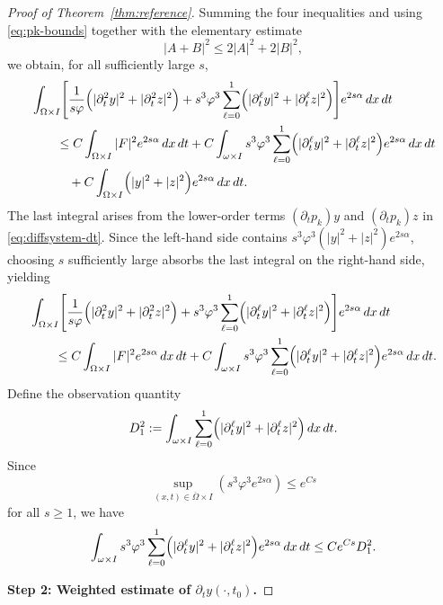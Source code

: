 \documentclass[10pt,a4paper]{amsart}
\newcommand{\Om}{\Omega}
\newcommand{\p}{\partial}
\begin{document}
\begin{proof}[Proof of Theorem~\ref{thm:reference}]
Summing the four inequalities and using \eqref{eq:pk-bounds} together with
the elementary estimate $$|A+B|^2\le2|A|^2+2|B|^2,$$ we obtain, for all
sufficiently large $s$,
\begin{align}
&\int_{\Omega\times I}\Biggl[
\frac{1}{s\varphi}\Bigl(|\p_t^2 y|^2+|\p_t^2 z|^2\Bigr)
+s^3\varphi^3\sum_{\ell=0}^1
\Bigl(|\p_t^\ell y|^2+|\p_t^\ell z|^2\Bigr)
\Biggr]e^{2s\alpha}\,dx\,dt \notag\\
&\qquad\le
C\int_{\Omega\times I}|F|^2 e^{2s\alpha}\,dx\,dt
+C\int_{\omega\times I}s^3\varphi^3\sum_{\ell=0}^1
\Bigl(|\p_t^\ell y|^2+|\p_t^\ell z|^2\Bigr)e^{2s\alpha}\,dx\,dt
\notag\\
&\qquad\quad
+C\int_{\Omega\times I}
\Bigl(|y|^2+|z|^2\Bigr)e^{2s\alpha}\,dx\,dt.
\label{eq:carleman-preabsorb}
\end{align}
The last integral arises from the lower-order terms
$(\p_t p_k)y$ and $(\p_t p_k)z$ in \eqref{eq:diffsystem-dt}.
Since the left-hand side contains
$s^3\varphi^3(|y|^2+|z|^2)e^{2s\alpha}$, choosing $s$ sufficiently large
absorbs the last integral on the right-hand side, yielding
\begin{align}
&\int_{\Omega\times I}\Biggl[
\frac{1}{s\varphi}\Bigl(|\p_t^2 y|^2+|\p_t^2 z|^2\Bigr)
+s^3\varphi^3\sum_{\ell=0}^1
\Bigl(|\p_t^\ell y|^2+|\p_t^\ell z|^2\Bigr)
\Biggr]e^{2s\alpha}\,dx\,dt \notag\\
&\qquad\le
C\int_{\Omega\times I}|F|^2 e^{2s\alpha}\,dx\,dt
+C\int_{\omega\times I}s^3\varphi^3\sum_{\ell=0}^1
\Bigl(|\p_t^\ell y|^2+|\p_t^\ell z|^2\Bigr)e^{2s\alpha}\,dx\,dt.
\label{eq:carleman-system}
\end{align}
Define the observation quantity
\begin{equation}\label{eq:D1-def}
D_1^2:=\int_{\omega\times I}\sum_{\ell=0}^1
\Bigl(|\p_t^\ell y|^2+|\p_t^\ell z|^2\Bigr)\,dx\,dt.
\end{equation}
Since $$\sup_{(x,t)\in\overline\Om\times I}
(s^3\varphi^3 e^{2s\alpha})\le e^{Cs}$$ for all $s\ge1$, we have
\begin{equation}\label{eq:obs-bound}
\int_{\omega\times I}s^3\varphi^3\sum_{\ell=0}^1
\Bigl(|\p_t^\ell y|^2+|\p_t^\ell z|^2\Bigr)e^{2s\alpha}\,dx\,dt
\le C e^{Cs} D_1^2.
\end{equation}

\medskip
\noindent\textbf{Step 2: Weighted estimate of $\p_t y(\cdot,t_0)$.}


\end{proof}
\end{document}
